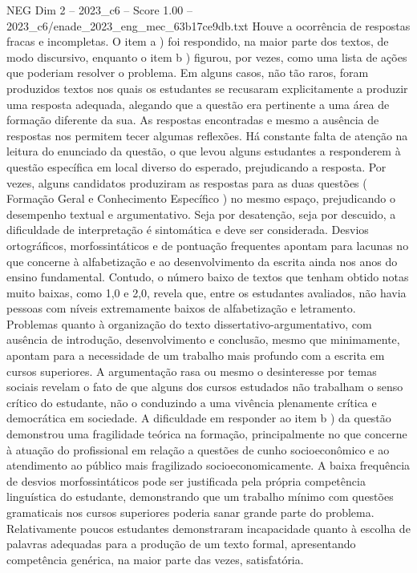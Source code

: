 \begin{textsample}{NEG Dim 2 – 2023\_c6 – Score 1.00 – 2023\_c6/enade\_2023\_eng\_mec\_63b17ce9db.txt}
Houve a ocorrência de respostas fracas e incompletas.
O item a ) foi respondido, na maior parte dos textos, de modo discursivo, enquanto o item b ) figurou, por vezes, como uma lista de ações que poderiam resolver o problema.
Em alguns casos, não tão raros, foram produzidos textos nos quais os estudantes se recusaram explicitamente a produzir uma resposta adequada, alegando que a questão era pertinente a uma área de formação diferente da sua.
As respostas encontradas e mesmo a ausência de respostas nos permitem tecer algumas reflexões.
Há constante falta de atenção na leitura do enunciado da questão, o que levou alguns estudantes a responderem à questão específica em local diverso do esperado, prejudicando a resposta.
Por vezes, alguns candidatos produziram as respostas para as duas questões ( Formação Geral e Conhecimento Específico ) no mesmo espaço, prejudicando o desempenho textual e argumentativo.
Seja por desatenção, seja por descuido, a dificuldade de interpretação é sintomática e deve ser considerada.
Desvios ortográficos, morfossintáticos e de pontuação frequentes apontam para lacunas no que concerne à alfabetização e ao desenvolvimento da escrita ainda nos anos do ensino fundamental.
Contudo, o número baixo de textos que tenham obtido notas muito baixas, como 1,0 e 2,0, revela que, entre os estudantes avaliados, não havia pessoas com níveis extremamente baixos de alfabetização e letramento.
Problemas quanto à organização do texto dissertativo-argumentativo, com ausência de introdução, desenvolvimento e conclusão, mesmo que minimamente, apontam para a necessidade de um trabalho mais profundo com a escrita em cursos superiores.
A argumentação rasa ou mesmo o desinteresse por temas sociais revelam o fato de que alguns dos cursos estudados não trabalham o senso crítico do estudante, não o conduzindo a uma vivência plenamente crítica e democrática em sociedade.
A dificuldade em responder ao item b ) da questão demonstrou uma fragilidade teórica na formação, principalmente no que concerne à atuação do profissional em relação a questões de cunho socioeconômico e ao atendimento ao público mais fragilizado socioeconomicamente.
A baixa frequência de desvios morfossintáticos pode ser justificada pela própria competência linguística do estudante, demonstrando que um trabalho mínimo com questões gramaticais nos cursos superiores poderia sanar grande parte do problema.
Relativamente poucos estudantes demonstraram incapacidade quanto à escolha de palavras adequadas para a produção de um texto formal, apresentando competência genérica, na maior parte das vezes, satisfatória.

\end{textsample}
